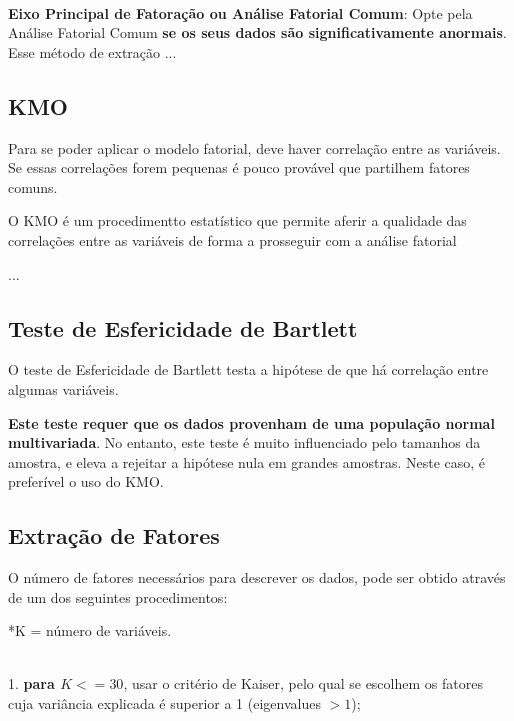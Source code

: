         \\
            
        \textbf{Eixo Principal de Fatoração ou Análise Fatorial Comum}: Opte pela Análise Fatorial Comum \textbf{se os seus dados são significativamente anormais}. Esse método de extração ...
        
    \subsection{KMO}
    
        Para se poder aplicar o modelo fatorial, deve haver correlação entre as variáveis. Se essas correlações forem pequenas é pouco provável que partilhem fatores comuns.
        
        O KMO é um procedimentto estatístico que permite aferir a qualidade das correlações entre as variáveis de forma a prosseguir com a análise fatorial
        
        ...
        
    \subsection{Teste de Esfericidade de Bartlett}
        
        O teste de Esfericidade de Bartlett testa a hipótese de que há correlação entre algumas variáveis.
        
        \textbf{Este teste requer que os dados provenham de uma população normal multivariada}. No entanto, este teste é muito influenciado pelo tamanhos da amostra, e eleva a rejeitar a hipótese nula em grandes amostras. Neste caso, é preferível o uso do KMO.
    
    \subsection{Extração de Fatores}
    
        O número de fatores necessários para descrever os dados, pode ser obtido através de um dos seguintes procedimentos:
        
        *K = número de variáveis.
        
        \\
        
        1. \textbf{para $K <= 30$}, usar o critério de Kaiser, pelo qual se escolhem os fatores cuja variância explicada é superior a 1 (eigenvalues $> 1$);
        
        \\
        
